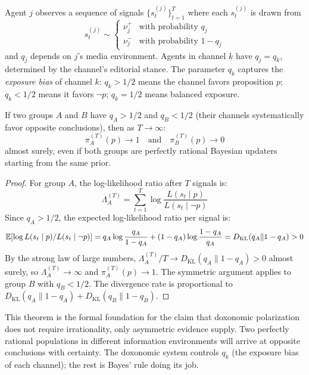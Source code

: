 \begin{model}
\label{mod:asymmetric-bayes}
Agent $j$ observes a sequence of signals $\{s_t^{(j)}\}_{t=1}^{T}$ where each $s_t^{(j)}$ is drawn from
\[
  s_t^{(j)} \sim \begin{cases} \nu^+_j & \text{with probability } q_j \\ \nu^-_j & \text{with probability } 1 - q_j \end{cases}
\]
and $q_j$ depends on $j$'s media environment.
Agents in channel $k$ have $q_j = q_k$, determined by the channel's editorial stance.
The parameter $q_k$ captures the \emph{exposure bias} of channel $k$: $q_k > 1/2$ means the channel favors proposition $p$; $q_k < 1/2$ means it favors $\neg p$; $q_k = 1/2$ means balanced exposure.
\end{model}

\begin{theorem}
\label{thm:polarization}
If two groups $A$ and $B$ have $q_A > 1/2$ and $q_B < 1/2$ (their channels systematically favor opposite conclusions), then as $T \to \infty$:
\[
  \pi_A^{(T)}(p) \to 1 \quad \text{and} \quad \pi_B^{(T)}(p) \to 0
\]
almost surely, even if both groups are perfectly rational Bayesian updaters starting from the same prior.
\end{theorem}

\begin{proof}
For group $A$, the log-likelihood ratio after $T$ signals is:
\[
  \Lambda_A^{(T)} = \sum_{t=1}^{T} \log \frac{L(s_t \mid p)}{L(s_t \mid \neg p)}
\]
Since $q_A > 1/2$, the expected log-likelihood ratio per signal is:
\[
  \mathbb{E}[\log L(s_t \mid p) / L(s_t \mid \neg p)] = q_A \log\frac{q_A}{1-q_A} + (1-q_A)\log\frac{1-q_A}{q_A} = D_{\mathrm{KL}}(q_A \| 1-q_A) > 0
\]
By the strong law of large numbers, $\Lambda_A^{(T)} / T \to D_{\mathrm{KL}}(q_A \| 1-q_A) > 0$ almost surely, so $\Lambda_A^{(T)} \to \infty$ and $\pi_A^{(T)}(p) \to 1$.
The symmetric argument applies to group $B$ with $q_B < 1/2$.
The divergence rate is proportional to $D_{\mathrm{KL}}(q_A \| 1-q_A) + D_{\mathrm{KL}}(q_B \| 1-q_B)$.
\end{proof}

\begin{remark}
This theorem is the formal foundation for the claim that doxonomic polarization does not require irrationality, only asymmetric evidence supply.
Two perfectly rational populations in different information environments will arrive at opposite conclusions with certainty.
The doxonomic system controls $q_k$ (the exposure bias of each channel); the rest is Bayes' rule doing its job.
\end{remark}


